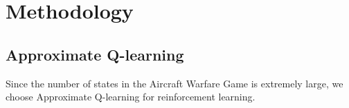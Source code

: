 \documentclass{article}
\begin{document}







    

\section{ Methodology}
    \subsection{Approximate Q-learning}
        Since the number of states in the Aircraft Warfare Game is extremely large, we choose Approximate Q-learning for reinforcement learning. 
\end{document}
